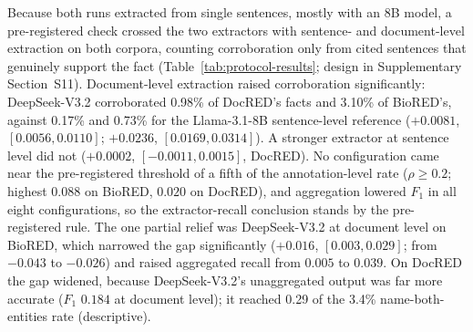 \documentclass[preprint,12pt,authoryear]{elsarticle}
\begin{document}
Because both runs extracted from single sentences, mostly with an 8B
model, a pre-registered check crossed the two extractors with sentence-
and document-level extraction on both corpora, counting corroboration
only from cited sentences that genuinely support the fact
(Table~\ref{tab:protocol-results}; design in Supplementary
Section~S11). Document-level extraction raised corroboration
significantly: DeepSeek-V3.2 corroborated 0.98\% of DocRED's facts and
3.10\% of BioRED's, against 0.17\% and 0.73\% for the Llama-3.1-8B
sentence-level reference ($+0.0081$, $[0.0056,\allowbreak 0.0110]$; $+0.0236$,
$[0.0169,\allowbreak 0.0314]$). A stronger extractor at sentence level did not
($+0.0002$, $[-0.0011,\allowbreak 0.0015]$, DocRED). No configuration came near the
pre-registered threshold of a fifth of the annotation-level rate ($\rho
\ge 0.2$; highest $0.088$ on BioRED, $0.020$ on DocRED), and aggregation
lowered $F_1$ in all eight configurations, so the extractor-recall
conclusion stands by the pre-registered rule. The one partial relief was
DeepSeek-V3.2 at document level on BioRED, which narrowed the gap
significantly ($+0.016$, $[0.003,\allowbreak 0.029]$; from $-0.043$ to $-0.026$) and
raised aggregated recall from $0.005$ to $0.039$. On DocRED the gap
widened, because DeepSeek-V3.2's unaggregated output was far more
accurate ($F_1$ $0.184$ at document level); it reached 0.29 of the 3.4\%
name-both-entities rate (descriptive).
\end{document}
